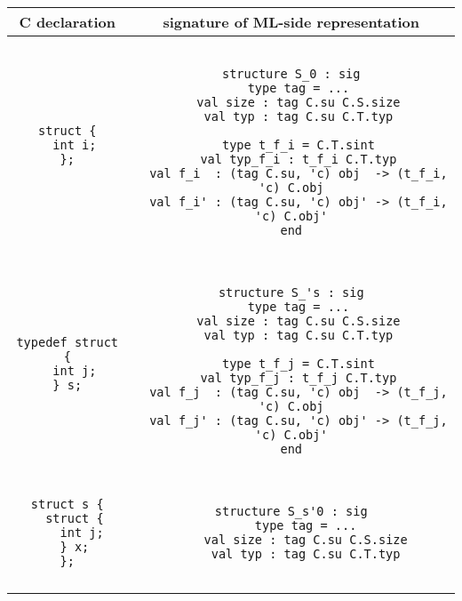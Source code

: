 \documentclass[titlepage,letterpaper]{article}
\begin{document}
\begin{small}
\begin{center}
\begin{tabular}{c|c}
C declaration & signature of ML-side representation \\ \hline\hline
\begin{minipage}{2in}
\begin{verbatim}
struct {
  int i;
};
\end{verbatim}
\end{minipage}
&
\begin{minipage}{4in}
\begin{verbatim}

structure S_0 : sig
  type tag = ...
  val size : tag C.su C.S.size
  val typ : tag C.su C.T.typ

  type t_f_i = C.T.sint
  val typ_f_i : t_f_i C.T.typ
  val f_i  : (tag C.su, 'c) obj  -> (t_f_i, 'c) C.obj
  val f_i' : (tag C.su, 'c) obj' -> (t_f_i, 'c) C.obj'
end

\end{verbatim}
\end{minipage}  
\\ \hline
\begin{minipage}{2in}
\begin{verbatim}
typedef struct {
  int j;
} s;
\end{verbatim}
\end{minipage}
&
\begin{minipage}{4in}
\begin{verbatim}

structure S_'s : sig
  type tag = ...
  val size : tag C.su C.S.size
  val typ : tag C.su C.T.typ

  type t_f_j = C.T.sint
  val typ_f_j : t_f_j C.T.typ
  val f_j  : (tag C.su, 'c) obj  -> (t_f_j, 'c) C.obj
  val f_j' : (tag C.su, 'c) obj' -> (t_f_j, 'c) C.obj'
end

\end{verbatim}
\end{minipage}  
\\ \hline
\begin{minipage}{2in}
\begin{verbatim}
struct s {
  struct {
    int j;
  } x;
};
\end{verbatim}
\end{minipage}
&
\begin{minipage}{4in}
\begin{verbatim}

structure S_s'0 : sig
    type tag = ...
    val size : tag C.su C.S.size
    val typ : tag C.su C.T.typ


\end{verbatim}
\end{minipage}
\end{tabular}
\end{center}
\end{small}
\end{document}
